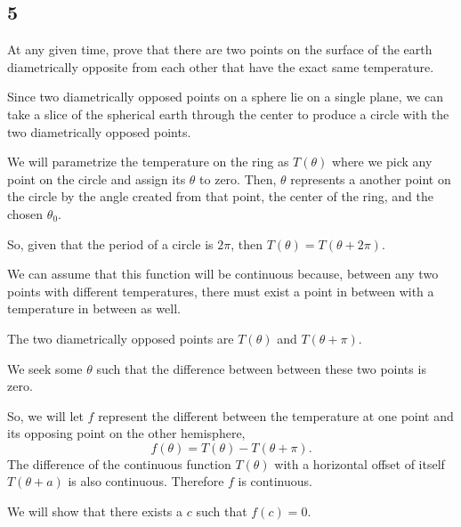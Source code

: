 \documentclass[../m134a-hw2.tex]{subfiles}
\begin{document}
\subsection*{5}
At any given time, prove that there are two points on the surface of the earth diametrically opposite
from each other that have the exact same temperature.

Since two diametrically opposed points on a sphere lie on a single plane, we can take a slice of the spherical earth through the center to produce a circle with the two diametrically opposed points.

We will parametrize the temperature on the ring as $T(\theta)$ where we pick any point on the circle and assign its $\theta$ to zero. 
Then, $\theta$ represents a another point on the circle by the angle created from that point, the center of the ring, and the chosen $\theta_0$.

So, given that the period of a circle is $2\pi$, then $T(\theta)=T(\theta+2\pi)$.

We can assume that this function will be continuous because, between any two points with different temperatures, there must exist a point in between with a temperature in between as well.

\begin{figure*}[ht] %
\centering
{}
\end{figure*}

The two diametrically opposed points are $T(\theta)$ and $T(\theta+\pi)$.

We seek some $\theta$ such that the difference between between these two points is zero.

So, we will let $f$ represent the different between the temperature at one point and its opposing point on the other hemisphere, \[f(\theta) = T(\theta) - T(\theta+\pi).\]
The difference of the continuous function $T(\theta)$ with a horizontal offset of itself $T(\theta + a)$ is also continuous. Therefore $f$ is continuous.

We will show that there exists a $c$ such that $f(c) = 0$.
\end{document}
